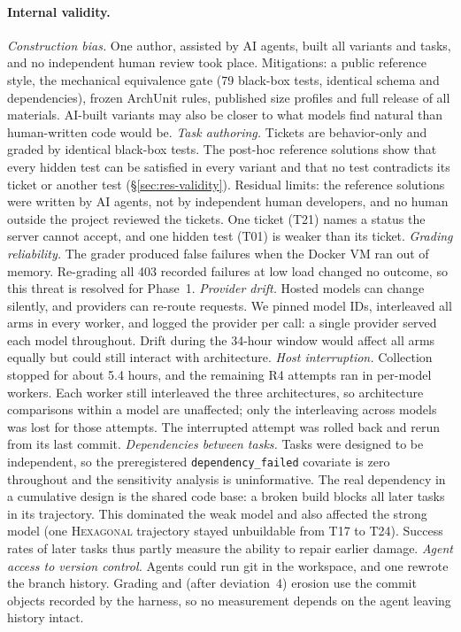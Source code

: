 \documentclass[10pt]{article}
\newcommand{\HEX}{\textsc{Hexagonal}}
\newcommand{\code}[1]{\texttt{#1}}
\begin{document}
\paragraph{Internal validity.}
\emph{Construction bias.} One author, assisted by AI agents, built all variants and tasks, and no
independent human review took place. Mitigations: a public reference style, the mechanical
equivalence gate (79 black-box tests, identical schema and dependencies), frozen ArchUnit rules,
published size profiles and full release of all materials. AI-built variants may also be closer
to what models find natural than human-written code would be. \emph{Task authoring.} Tickets are
behavior-only and graded by identical black-box tests. The post-hoc reference solutions show that
every hidden test can be satisfied in every variant and that no test contradicts its ticket or
another test (\S\ref{sec:res-validity}). Residual limits: the reference solutions were written by
AI agents, not by independent human developers, and no human outside the project reviewed the
tickets. One ticket (T21) names a status the server cannot accept, and one hidden test (T01) is
weaker than its ticket. \emph{Grading reliability.} The grader produced false failures when the
Docker VM ran out of memory. Re-grading all 403 recorded failures at low load changed no outcome,
so this threat is resolved for Phase~1.
\emph{Provider drift.} Hosted models can change silently, and providers can re-route requests. We
pinned model IDs, interleaved all arms in every worker, and logged the provider per call: a single
provider served each model throughout. Drift during the 34-hour window would affect all arms
equally but could still interact with architecture. \emph{Host interruption.} Collection stopped
for about 5.4 hours, and the remaining R4 attempts ran in per-model workers. Each worker still
interleaved the three architectures, so architecture comparisons within a model are unaffected;
only the interleaving across models was lost for those attempts. The interrupted attempt was rolled back and
rerun from its last commit. \emph{Dependencies between tasks.} Tasks were designed to be
independent, so the preregistered \code{dependency\_failed} covariate is zero throughout and the
sensitivity analysis is uninformative. The real dependency in a cumulative design is the shared
code base: a broken build blocks all later tasks in its trajectory. This dominated the weak model
and also affected the strong model (one \HEX{} trajectory stayed unbuildable from T17 to T24).
Success rates of later tasks thus partly measure the ability to repair earlier damage.
\emph{Agent access to version control.} Agents could run git in the workspace, and one rewrote the
branch history. Grading and (after deviation~4) erosion use the commit objects recorded by the
harness, so no measurement depends on the agent leaving history intact.
\end{document}
